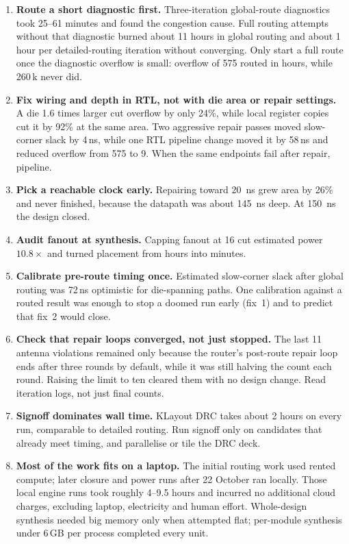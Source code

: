 \begin{enumerate}
\item \textbf{Route a short diagnostic first.} Three-iteration global-route diagnostics took 25--61 minutes and found the congestion cause. Full routing attempts without that diagnostic burned about 11 hours in global routing and about 1 hour per detailed-routing iteration without converging. Only start a full route once the diagnostic overflow is small: overflow of 575 routed in hours, while 260\,k never did.
\item \textbf{Fix wiring and depth in RTL, not with die area or repair settings.} A die 1.6 times larger cut overflow by only 24\%, while local register copies cut it by 92\% at the same area. Two aggressive repair passes moved slow-corner slack by 4\,ns, while one RTL pipeline change moved it by 58\,ns and reduced overflow from 575 to 9. When the same endpoints fail after repair, pipeline.
\item \textbf{Pick a reachable clock early.} Repairing toward \SI{20}{ns} grew area by 26\% and never finished, because the datapath was about \SI{145}{ns} deep. At \SI{150}{ns} the design closed.
\item \textbf{Audit fanout at synthesis.} Capping fanout at 16 cut estimated power $10.8\times$ and turned placement from hours into minutes.
\item \textbf{Calibrate pre-route timing once.} Estimated slow-corner slack after global routing was 72\,ns optimistic for die-spanning paths. One calibration against a routed result was enough to stop a doomed run early (fix~1) and to predict that fix~2 would close.
\item \textbf{Check that repair loops converged, not just stopped.} The last 11 antenna violations remained only because the router's post-route repair loop ends after three rounds by default, while it was still halving the count each round. Raising the limit to ten cleared them with no design change. Read iteration logs, not just final counts.
\item \textbf{Signoff dominates wall time.} KLayout DRC takes about 2 hours on every run, comparable to detailed routing. Run signoff only on candidates that already meet timing, and parallelise or tile the DRC deck.
\item \textbf{Most of the work fits on a laptop.} The initial routing work used rented compute; later closure and power runs after 22 October ran locally. Those local engine runs took roughly 4--9.5 hours and incurred no additional cloud charges, excluding laptop, electricity and human effort. Whole-design synthesis needed big memory only when attempted flat; per-module synthesis under 6\,GB per process completed every unit.

\end{enumerate}
